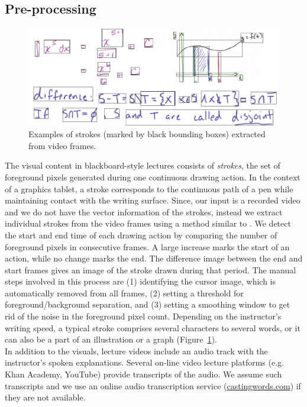 \subsection{Pre-processing}
\begin{figure}[t!]
    \centering
        \includegraphics[width=\textwidth]{figures/strokes.pdf}
    \caption{Examples of strokes (marked by black bounding boxes) extracted from video frames.} 
    \label{Fig:stroke_examples}
\end{figure}
The visual content in blackboard-style lectures consists of \emph{strokes},
the set of foreground pixels generated during one continuous drawing action.
In the context of a graphics tablet, a stroke corresponds to the continuous
path of a pen while maintaining contact with the writing surface. 
Since, our input is a recorded video and we do not have the vector information of the strokes, instead we extract
individual strokes from the video frames using a method similar to
\cite{monserrat2013notevideo}.  We detect the start and end time of
each drawing action by comparing the number of foreground pixels in
consecutive frames. A large increase marks the start of an action,
while no change marks the end. The difference image between the end
and start frames gives an image of the stroke drawn during that
period.
The manual steps involved in this process are (1) identifying the cursor image, which is automatically removed from all frames, (2) setting a threshold for foreground/background separation, and (3)  setting a smoothing window to get rid of the noise in the foreground pixel count. Depending on the instructor's writing speed, a typical stroke
comprises several characters to several words, or it can also be a
part of an illustration or a graph (Figure~\ref{Fig:stroke_examples}).\\

In addition
to the visuals, lecture videos include an audio track with the instructor's
spoken explanations. Several on-line video lecture platforms (e.g. Khan Academy,
YouTube) provide transcripts of the audio. We assume such transcripts and
we use an online audio transcription service (\url{castingwords.com}) if they are
not available. 
%
